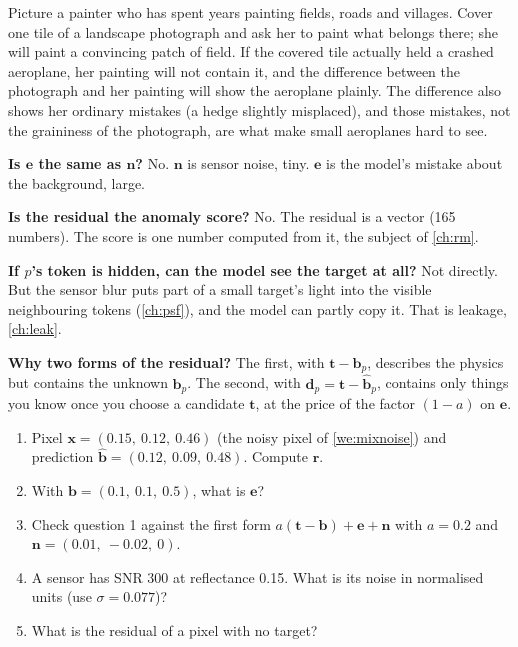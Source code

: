 \documentclass[11pt,a4paper,oneside,openany]{book}
\newcommand{\B}[1]{{\symbf{#1}}}
\newcommand{\B}[1]{{\bm{#1}}}
\newcommand{\vx}{\B{x}}
\newcommand{\vt}{\B{t}}
\newcommand{\vb}{\B{b}}
\newcommand{\vbh}{\hat{\B{b}}}
\newcommand{\vr}{\B{r}}
\newcommand{\ve}{\B{e}}
\newcommand{\vn}{\B{n}}
\newcommand{\vd}{\B{d}}
\begin{document}
\begin{analogy}
Picture a painter who has spent years painting fields, roads and villages. Cover one tile of a landscape photograph and ask her to
paint what belongs there; she will paint a convincing patch of field. If the covered tile actually held a crashed aeroplane, her
painting will not contain it, and the difference between the photograph and her painting will show the aeroplane plainly. The
difference also shows her ordinary mistakes (a hedge slightly misplaced), and those mistakes, not the graininess of the photograph,
are what make small aeroplanes hard to see.
\end{analogy}

\begin{confusions}
\textbf{Is $\ve$ the same as $\vn$?} No. $\vn$ is sensor noise, tiny. $\ve$ is the model's mistake about the background, large.

\textbf{Is the residual the anomaly score?} No. The residual is a vector (165 numbers). The score is one number computed from it,
the subject of \cref{ch:rm}.

\textbf{If $p$'s token is hidden, can the model see the target at all?} Not directly. But the sensor blur puts part of a small
target's light into the visible neighbouring tokens (\cref{ch:psf}), and the model can partly copy it. That is leakage,
\cref{ch:leak}.

\textbf{Why two forms of the residual?} The first, with $\vt-\vb_p$, describes the physics but contains the unknown $\vb_p$. The second,
with $\vd_p=\vt-\vbh_p$, contains only things you know once you choose a candidate $\vt$, at the price of the factor $(1-a)$ on $\ve$.
\end{confusions}

\begin{checkyourself}
\begin{enumerate}
\item Pixel $\vx=(0.15,\ 0.12,\ 0.46)$ (the noisy pixel of \cref{we:mixnoise}) and prediction $\vbh=(0.12,\ 0.09,\ 0.48)$. Compute $\vr$.
\item With $\vb=(0.1,\ 0.1,\ 0.5)$, what is $\ve$?
\item Check question 1 against the first form $a(\vt-\vb)+\ve+\vn$ with $a=0.2$ and $\vn=(0.01,\ -0.02,\ 0)$.
\item A sensor has SNR 300 at reflectance 0.15. What is its noise in normalised units (use $\sigma=0.077$)?
\item What is the residual of a pixel with no target?
\end{enumerate}
\end{checkyourself}
\end{document}
